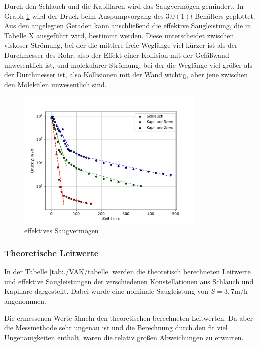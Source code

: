 \documentclass[11pt, a4paper]{article}
\begin{document}
    Durch den Schlauch und die Kapillaren wird das Saugvermögen gemindert. In Graph \ref{fig:effSaug} wird der Druck beim Auspumpvorgang des $3.0(1) l$ Behälters geplottet. Aus den angelegten Geraden kann anschließend die effektive Saugleistung, die in Tabelle X ausgeführt wird, bestimmt werden. Diese unterscheidet zwischen viskoser Strömung, bei der die mittlere freie Weglänge viel kürzer ist als der Durchmesser des Rohr, also der Effekt einer Kollision mit der Gefäßwand unwesentlich ist, und molekularer Strömung, bei der die Weglänge viel größer als der Durchmesser ist, also Kollisionen mit der Wand wichtig, aber jene zwischen den Molekülen unwesentlich sind.

    \begin{figure}[h]
        \centering
        \includegraphics[width=0.8\textwidth]{Saugver.pdf}
        \caption{effektives Saugvermögen}
        \label{fig:effSaug}
    \end{figure}

    

    

    \subsubsection{Theoretische Leitwerte}
    In der Tabelle \ref{tab:./VAK/tabelle} werden die theoretisch berechneten Leitwerte und effektive Saugleistungen der verschiedenen Konstellationen aus Schlauch und Kapillare dargestellt. Dabei wurde eine nominale Saugleistung von $S = 3,7 \si{\meter\per\hour}$ angenommen.
    
    Die ermessenen Werte ähneln den theoretischen berechneten Leitwerten. Da aber die Messmethode sehr ungenau ist und die Berechnung durch den fit viel Ungenauigkeiten enthält, waren die relativ großen Abweichungen zu erwarten.
\end{document}
